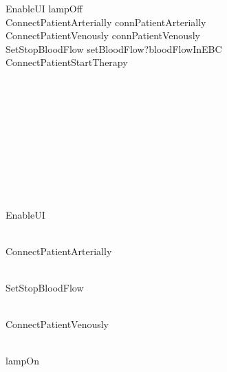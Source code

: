 \begin{circus}
	EnableUI \circdef lampOff \then \Skip\\
	ConnectPatientArterially \circdef connPatientArterially \then \Skip\\
	ConnectPatientVenously \circdef connPatientVenously \then \Skip\\
	SetStopBloodFlow \circdef setBloodFlow?bloodFlowInEBC \then \Skip\\
	ConnectPatientStartTherapy \circdef \\
	\begin{block}
		\\
		\begin{block}
			\\
			\begin{block}
				\\
				\begin{block}
					\\
					\begin{block}
						\\
						\begin{block}
							
						\end{block}\\
						 \circseq EnableUI
					\end{block}\\
					 \circseq ConnectPatientArterially
				\end{block}\\
				 \circseq SetStopBloodFlow
			\end{block}\\
			 \circseq ConnectPatientVenously
		\end{block}\\
		 \circseq lampOn \then \Skip\\
	\end{block}\\
	

\end{circus}
